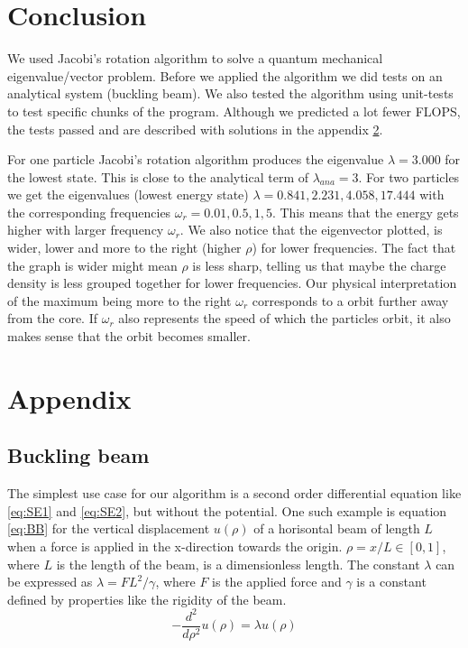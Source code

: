 \documentclass[reprint,english,notitlepage,nofootinbib]{revtex4-1}  %
\begin{document}
\section{Conclusion}

We used Jacobi's rotation algorithm to solve a quantum mechanical eigenvalue/vector problem. Before we applied the algorithm we did tests on an analytical system (buckling beam). We also tested the algorithm using unit-tests to test specific chunks of the program. Although we predicted a lot fewer FLOPS, the tests passed and are described with solutions in the appendix \ref{appendix}.

For one particle Jacobi's rotation algorithm produces the eigenvalue $\lambda = 3.000$ for the lowest state. This is close to the analytical term of $\lambda_{ana} = 3$. For two particles we get the eigenvalues (lowest energy state) $\lambda = 0.841, 2.231, 4.058, 17.444$ with the corresponding frequencies $\omega_r = 0.01, 0.5, 1, 5$. This means that the energy gets higher with larger frequency $\omega_r$. We also notice that the eigenvector plotted, is wider, lower and more to the right (higher $\rho$) for lower frequencies. The fact that the graph is wider might mean $\rho$ is less sharp, telling us that maybe the charge density is less grouped together for lower frequencies. Our physical interpretation of the maximum being more to the right $\omega_r$ corresponds to a orbit further away from the core. If $\omega_r$ also represents the speed of which the particles orbit, it also makes sense that the orbit becomes smaller.

\section{Appendix}
\label{appendix}

\subsection{Buckling beam}

The simplest use case for our algorithm is a second order differential equation like \ref{eq:SE1} and \ref{eq:SE2}, but without the potential. One such example is equation \ref{eq:BB} for the vertical displacement $u(\rho)$ of a horisontal beam of length $L$ when a force is applied in the x-direction towards the origin. $\rho = x/L \in [0, 1]$, where $L$ is the length of the beam, is a dimensionless length. The constant $\lambda$ can be expressed as $\lambda = F L^2 / \gamma$, where $F$ is the applied force and $\gamma$ is a constant defined by properties like the rigidity of the beam.
\begin{equation}
	-\frac{d^2}{d\rho^2}u(\rho) = \lambda u(\rho)
	\label{eq:BB}
\end{equation}
\end{document}
